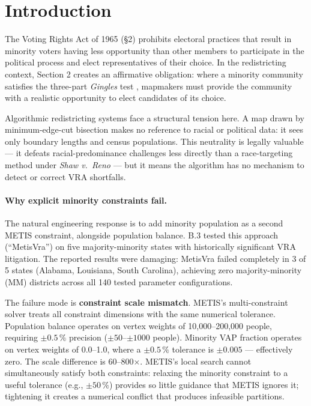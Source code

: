 \section{Introduction}
\label{sec:intro}

The Voting Rights Act of 1965 (\S 2) prohibits electoral practices that
result in minority voters having less opportunity than other members to
participate in the political process and elect representatives of their
choice.
In the redistricting context, Section 2 creates an affirmative obligation:
where a minority community satisfies the three-part \emph{Gingles} test
\citep{gingles1986}, mapmakers must provide the community with a realistic
opportunity to elect candidates of its choice.

Algorithmic redistricting systems face a structural tension here.
A map drawn by minimum-edge-cut bisection makes no reference to racial
or political data: it sees only boundary lengths and census populations.
This neutrality is legally valuable --- it defeats racial-predominance challenges
less directly than a race-targeting method under \emph{Shaw v.\ Reno}
\citep{shaw1993} --- but it means the algorithm has no mechanism to detect or
correct VRA shortfalls.

\paragraph{Why explicit minority constraints fail.}
The natural engineering response is to add minority population as a second
METIS constraint, alongside population balance.
B.3 \citep{b3paper} tested this approach (``MetisVra'') on five
majority-minority states with historically significant VRA litigation.
The reported results were damaging: MetisVra failed completely in 3 of 5 states
(Alabama, Louisiana, South Carolina), achieving zero majority-minority
(MM) districts across all 140 tested parameter configurations.

The failure mode is \textbf{constraint scale mismatch}.
METIS's multi-constraint solver treats all constraint dimensions with
the same numerical tolerance.
Population balance operates on vertex weights of 10,000--200,000 people,
requiring $\pm 0.5\,\%$ precision ($\pm 50$--$\pm 1000$ people).
Minority VAP fraction operates on vertex weights of 0.0--1.0, where
a $\pm 0.5\,\%$ tolerance is $\pm 0.005$ --- effectively zero.
The scale difference is 60--800$\times$.
METIS's local search cannot simultaneously satisfy both constraints:
relaxing the minority constraint to a useful tolerance (e.g., $\pm 50\,\%$)
provides so little guidance that METIS ignores it; tightening it creates
a numerical conflict that produces infeasible partitions.

